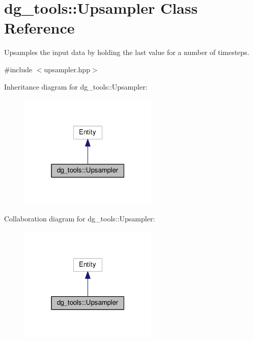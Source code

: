 \hypertarget{classdg__tools_1_1Upsampler}{}\section{dg\+\_\+tools\+:\+:Upsampler Class Reference}
\label{classdg__tools_1_1Upsampler}


Upsamples the input data by holding the last value for a number of timesteps.  




{\ttfamily \#include $<$upsampler.\+hpp$>$}



Inheritance diagram for dg\+\_\+tools\+:\+:Upsampler\+:
\nopagebreak
\begin{figure}[H]
\begin{center}
\leavevmode
\includegraphics[width=187pt]{classdg__tools_1_1Upsampler__inherit__graph}
\end{center}
\end{figure}


Collaboration diagram for dg\+\_\+tools\+:\+:Upsampler\+:
\nopagebreak
\begin{figure}[H]
\begin{center}
\leavevmode
\includegraphics[width=187pt]{classdg__tools_1_1Upsampler__coll__graph}
\end{center}
\end{figure}
